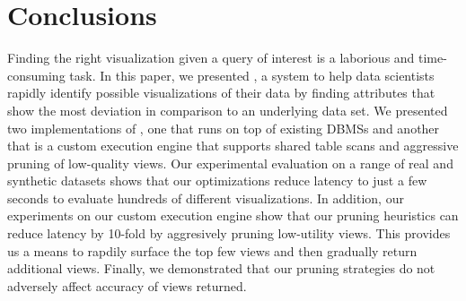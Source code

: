 
\section{Conclusions}
\label{sec:conc}

Finding the right visualization given a query of interest is a
laborious and time-consuming task.
In this paper, we presented \SeeDB, a system to help data scientists 
rapidly identify possible visualizations of their data by finding
attributes that show the most deviation in comparison to an underlying data set.
We presented two implementations of \SeeDB, one that runs on top of existing
DBMSs and another that is a custom execution engine that supports shared table scans
and aggressive pruning of low-quality views.
Our experimental evaluation on a range of real and synthetic datasets shows that
our optimizations reduce latency to just a few seconds to evaluate hundreds of different
visualizations.
In addition, our experiments on our custom execution engine show that our pruning
heuristics can reduce latency by 10-fold by aggresively pruning low-utility views.
This provides us a means to rapdily surface the top few views and then
gradually return additional views.
Finally, we demonstrated that our pruning
strategies do not adversely affect accuracy of views returned.